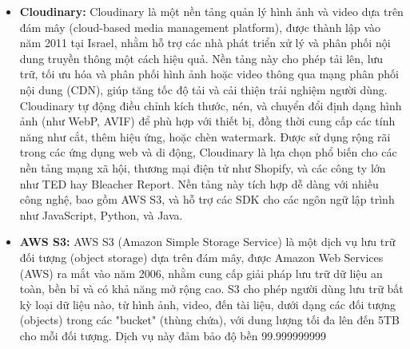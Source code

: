 \begin{itemize}
    \item \textbf{Cloudinary:} Cloudinary là một nền tảng quản lý hình ảnh và video dựa trên đám mây (cloud-based media management platform), được thành lập vào năm 2011 tại Israel, nhằm hỗ trợ các nhà phát triển xử lý và phân phối nội dung truyền thông một cách hiệu quả. Nền tảng này cho phép tải lên, lưu trữ, tối ưu hóa và phân phối hình ảnh hoặc video thông qua mạng phân phối nội dung (CDN), giúp tăng tốc độ tải và cải thiện trải nghiệm người dùng. Cloudinary tự động điều chỉnh kích thước, nén, và chuyển đổi định dạng hình ảnh (như WebP, AVIF) để phù hợp với thiết bị, đồng thời cung cấp các tính năng như cắt, thêm hiệu ứng, hoặc chèn watermark. Được sử dụng rộng rãi trong các ứng dụng web và di động, Cloudinary là lựa chọn phổ biến cho các nền tảng mạng xã hội, thương mại điện tử như Shopify, và các công ty lớn như TED hay Bleacher Report. Nền tảng này tích hợp dễ dàng với nhiều công nghệ, bao gồm AWS S3, và hỗ trợ các SDK cho các ngôn ngữ lập trình như JavaScript, Python, và Java.
\end{itemize}

\begin{itemize}
    \item \textbf{AWS S3:} AWS S3 (Amazon Simple Storage Service) là một dịch vụ lưu trữ đối tượng (object storage) dựa trên đám mây, được Amazon Web Services (AWS) ra mắt vào năm 2006, nhằm cung cấp giải pháp lưu trữ dữ liệu an toàn, bền bỉ và có khả năng mở rộng cao. S3 cho phép người dùng lưu trữ bất kỳ loại dữ liệu nào, từ hình ảnh, video, đến tài liệu, dưới dạng các đối tượng (objects) trong các "bucket" (thùng chứa), với dung lượng tối đa lên đến 5TB cho mỗi đối tượng. Dịch vụ này đảm bảo độ bền 99.999999999%
\end{itemize}

